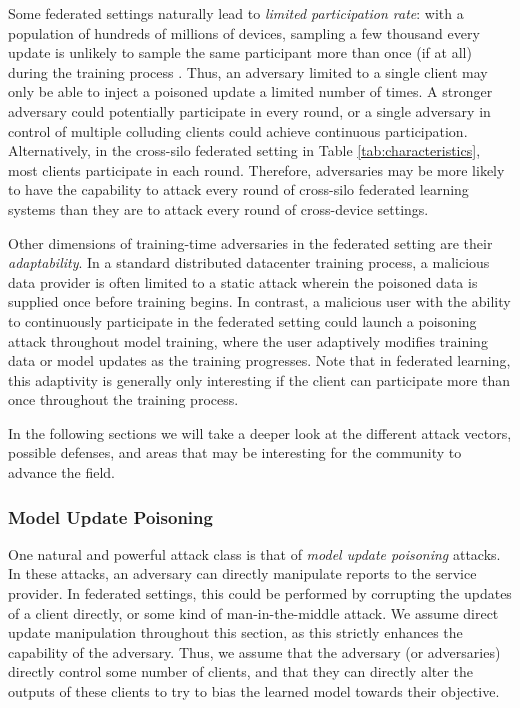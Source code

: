 Some federated settings naturally lead to \emph{limited participation rate}: with a population of hundreds of millions of devices, sampling a few thousand every update is unlikely to sample the same participant more than once (if at all) during the training process \citep{bonawitz19sysml}. Thus, an adversary limited to a single client may only be able to inject a poisoned update a limited number of times. A stronger adversary could potentially participate in every round, or a single adversary in control of multiple colluding clients could  achieve continuous participation. Alternatively, in the cross-silo federated setting in Table \ref{tab:characteristics}, most clients participate in each round. Therefore, adversaries may be more likely to have the capability to attack every round of cross-silo federated learning systems than they are to attack every round of cross-device settings.

Other dimensions of training-time adversaries in the federated setting are their \emph{adaptability}. In a standard distributed datacenter training process, a malicious data provider is often limited to a static attack wherein the poisoned data is supplied once before training begins. In contrast, a malicious user with the ability to continuously participate in the federated setting could launch a poisoning attack throughout model training, where the user adaptively modifies training data or model updates as the training progresses. Note that in federated learning, this adaptivity is generally only interesting if the client can participate more than once throughout the training process.

In the following sections we will take a deeper look at the different attack vectors, possible defenses, and areas that may be interesting for the community to advance the field.

\subsubsection{Model Update Poisoning}
\label{subsubsec:model_poisoning}

One natural and powerful attack class is that of \emph{model update poisoning} attacks. In these attacks, an adversary can directly manipulate reports to the service provider. In federated settings, this could be performed by corrupting the updates of a client directly, or some kind of man-in-the-middle attack. We assume direct update manipulation throughout this section, as this strictly enhances the capability of the adversary. Thus, we assume that the adversary (or adversaries) directly control some number of clients, and that they can directly alter the outputs of these clients to try to bias the learned model towards their objective.

